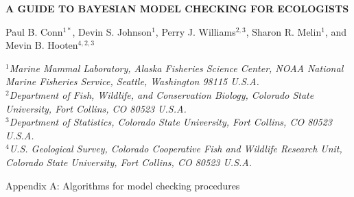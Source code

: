 \documentclass[12pt,english]{article}
\begin{document}
\begin{center} \bf {\large A GUIDE TO BAYESIAN MODEL CHECKING FOR ECOLOGISTS}

\vspace{0.7cm}
Paul B. Conn$^{1*}$, Devin S. Johnson$^1$, Perry J. Williams$^{2,3}$, Sharon R. Melin$^1$, and Mevin
    B. Hooten$^{4,2,3}$
\end{center}
\vspace{0.5cm}

\rm
\small

\it $^1$Marine Mammal Laboratory, Alaska Fisheries Science Center,
NOAA National Marine Fisheries Service,
Seattle, Washington 98115 U.S.A.\\

\it $^2$Department of Fish, Wildlife, and Conservation Biology, Colorado State University, Fort Collins, CO 80523 U.S.A.\\

\it $^3$Department of Statistics, Colorado State University, Fort Collins, CO 80523 U.S.A.\\

\it $^4$U.S. Geological Survey, Colorado Cooperative Fish and Wildlife Research Unit, Colorado State University, Fort Collins, CO 80523 U.S.A.\\

\raggedbottom
\vspace{.5in}

\rm
Appendix A: Algorithms for model checking procedures
\bigskip

\vspace{.3in}

\doublespacing
\end{document}
